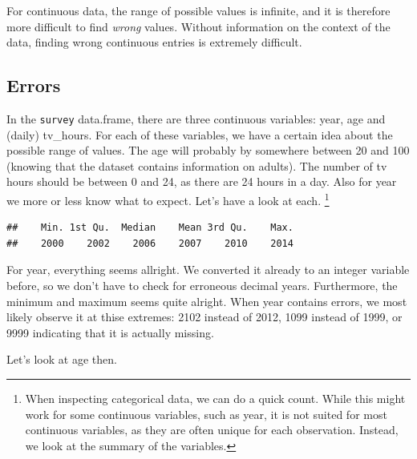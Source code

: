 \documentclass[]{tufte-book}
\newenvironment{Shaded}{}{}
\newcommand{\KeywordTok}[1]{\textcolor[rgb]{0.00,0.44,0.13}{\textbf{#1}}}
\newcommand{\NormalTok}[1]{#1}
\newcommand{\OperatorTok}[1]{\textcolor[rgb]{0.40,0.40,0.40}{#1}}
\begin{document}
For continuous data, the range of possible values is infinite, and it is therefore more difficult to find \emph{wrong} values. Without information on the context of the data, finding wrong continuous entries is extremely difficult.

\hypertarget{errors}{%
\subsection{Errors}\label{errors}}

In the \texttt{survey} data.frame, there are three continuous variables: year, age and (daily) tv\_hours. For each of these variables, we have a certain idea about the possible range of values. The age will probably by somewhere between 20 and 100 (knowing that the dataset contains information on adults). The number of tv hours should be between 0 and 24, as there are 24 hours in a day. Also for year we more or less know what to expect. Let's have a look at each. \footnote{When inspecting categorical data, we can do a quick count. While this might work for some continuous variables, such as year, it is not suited for most continuous variables, as they are often unique for each observation. Instead, we look at the summary of the variables.}

\begin{Shaded}
\end{Shaded}

\begin{verbatim}
##    Min. 1st Qu.  Median    Mean 3rd Qu.    Max. 
##    2000    2002    2006    2007    2010    2014
\end{verbatim}

For year, everything seems allright. We converted it already to an integer variable before, so we don't have to check for erroneous decimal years. Furthermore, the minimum and maximum seems quite alright. When year contains errors, we most likely observe it at thise extremes: 2102 instead of 2012, 1099 instead of 1999, or 9999 indicating that it is actually missing.

Let's look at age then.

\begin{Shaded}
\end{Shaded}
\end{document}

